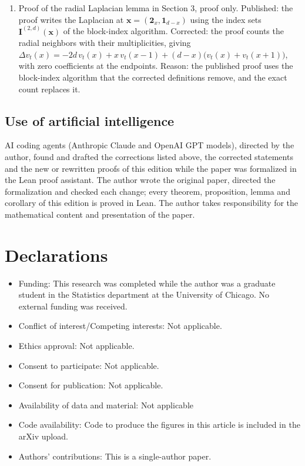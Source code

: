 \documentclass[12pt]{amsart}
\begin{document}
\begin{enumerate}
\item[C25.] Proof of the radial Laplacian lemma in Section 3, proof only. Published: the proof writes the Laplacian at $\mathbf{x} = (\mathbf{2}_x, \mathbf{1}_{d-x})$ using the index sets $\mathbf{I}^{(2,d)}(\mathbf{x})$ of the block-index algorithm. Corrected: the proof counts the radial neighbors with their multiplicities, giving $\Delta v_t(x) = -2d\, v_t(x) + x\, v_t(x-1) + (d-x)\bigl(v_t(x) + v_t(x+1)\bigr)$, with zero coefficients at the endpoints. Reason: the published proof uses the block-index algorithm that the corrected definitions remove, and the exact count replaces it.
\end{enumerate}

\subsection*{Use of artificial intelligence}

AI coding agents (Anthropic Claude and OpenAI GPT models), directed by the author, found and drafted the corrections listed above, the corrected statements and the new or rewritten proofs of this edition while the paper was formalized in the Lean proof assistant. The author wrote the original paper, directed the formalization and checked each change; every theorem, proposition, lemma and corollary of this edition is proved in Lean. The author takes responsibility for the mathematical content and presentation of the paper.

\section*{Declarations}

\begin{itemize}
\item Funding: This research was completed while the author was a graduate student in the Statistics department at the University of Chicago. No external funding was received. 
\item Conflict of interest/Competing interests: Not applicable. 
\item Ethics approval: Not applicable. 
\item Consent to participate: Not applicable. 
\item Consent for publication: Not applicable. 
\item Availability of data and material: Not applicable
\item Code availability: Code to produce the figures in this article is included in the arXiv upload.
\item Authors' contributions: This is a single-author paper. 
\end{itemize}
	
	
	
	
	
\end{document}
